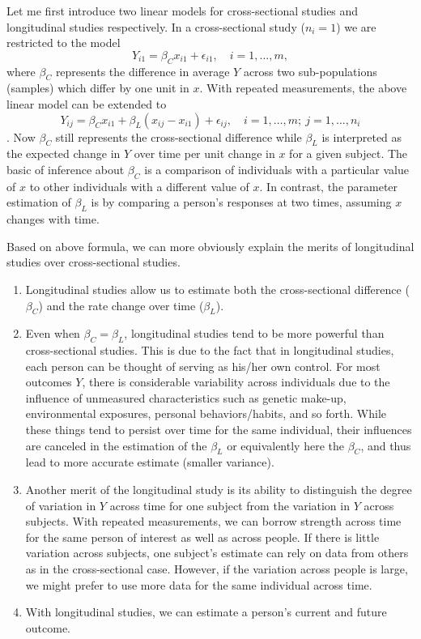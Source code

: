 \documentclass[12pt]{article}
\begin{document}
Let me first introduce two linear models for cross-sectional studies and longitudinal studies respectively. In a cross-sectional study ($n_i = 1$) we are restricted to the model
$$Y_{i1} = \beta_C x_{i1} + \epsilon_{i1}, \quad i = 1,\ldots,m, $$
where $\beta_C$ represents the difference in average $Y$ across two sub-populations (samples) which differ by one unit in $x$. With repeated measurements, the above linear model can be extended to
$$ Y_{ij} = \beta_C x_{i1} + \beta_L ( x_{ij} - x_{i1} ) + \epsilon_{ij}, \quad i = 1, \ldots, m; \ j = 1, \ldots, n_i $$
\cite{WARE1990}. Now $\beta_C$ still represents the cross-sectional difference while $\beta_L$ is interpreted as the expected change in $Y$ over time per unit change in $x$ for a given subject. The basic of inference about $\beta_C$ is a comparison of individuals with a particular value of $x$ to other individuals with a different value of $x$. In contrast, the parameter estimation of $\beta_L$ is by comparing a person's responses at two times, assuming $x$ changes with time.

Based on above formula, we can more obviously explain the merits of longitudinal studies over cross-sectional studies. 
\begin{enumerate}
\item Longitudinal studies allow us to estimate both the cross-sectional difference ($\beta_C$) and the rate change over time ($\beta_L$).
\item Even when $\beta_C = \beta_L$, longitudinal studies tend to be more powerful than cross-sectional studies. This is due to the fact that in longitudinal studies, each person can be thought of serving as his/her own control. For most outcomes $Y$, there is considerable variability across individuals due to the influence of unmeasured characteristics such as genetic make-up, environmental exposures, personal behaviors/habits, and so forth. While these things tend to persist over time for the same individual, their influences are canceled in the estimation of the $\beta_L$ or equivalently here the $\beta_C$, and thus lead to more accurate estimate (smaller variance).
\item Another merit of the longitudinal study is its ability to distinguish the degree of variation in $Y$ across time for one subject from the variation in $Y$ across subjects. With repeated measurements, we can borrow strength across time for the same person of interest as well as across people. If there is little variation across subjects, one subject's estimate can rely on data from others as in the cross-sectional case. However, if the variation across people is large, we might prefer to use more data for the same individual across time.
\item With longitudinal studies, we can estimate a person's current and future outcome. 
\end{enumerate}
\end{document}
